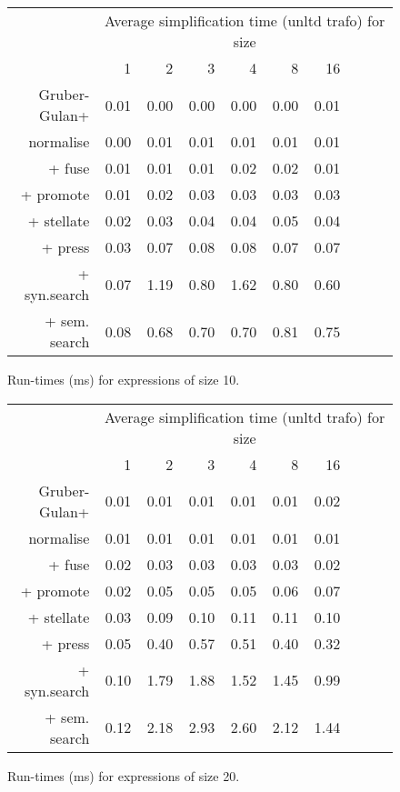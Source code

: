 \begin{figure}\begin{tabular}{rrrrrrrrrr}
 & \multicolumn{9}{c}{Average simplification time (unltd trafo) for size} \\
 & 1 & 2 & 3 & 4 & 8 & 16 \\
Gruber-Gulan+ & 0.01 & 0.00 & 0.00 & 0.00 & 0.00 & 0.01 \\
normalise & 0.00 & 0.01 & 0.01 & 0.01 & 0.01 & 0.01 \\
+ fuse & 0.01 & 0.01 & 0.01 & 0.02 & 0.02 & 0.01 \\
+ promote & 0.01 & 0.02 & 0.03 & 0.03 & 0.03 & 0.03 \\
+ stellate & 0.02 & 0.03 & 0.04 & 0.04 & 0.05 & 0.04 \\
+ press & 0.03 & 0.07 & 0.08 & 0.08 & 0.07 & 0.07 \\
+ syn.search & 0.07 & 1.19 & 0.80 & 1.62 & 0.80 & 0.60 \\
+ sem. search & 0.08 & 0.68 & 0.70 & 0.70 & 0.81 & 0.75 \\
\end{tabular}\caption{Run-times (ms) for expressions of size 10.}\end{figure}
\begin{figure}\begin{tabular}{rrrrrrrrrr}
 & \multicolumn{9}{c}{Average simplification time (unltd trafo) for size} \\
 & 1 & 2 & 3 & 4 & 8 & 16 \\
Gruber-Gulan+ & 0.01 & 0.01 & 0.01 & 0.01 & 0.01 & 0.02 \\
normalise & 0.01 & 0.01 & 0.01 & 0.01 & 0.01 & 0.01 \\
+ fuse & 0.02 & 0.03 & 0.03 & 0.03 & 0.03 & 0.02 \\
+ promote & 0.02 & 0.05 & 0.05 & 0.05 & 0.06 & 0.07 \\
+ stellate & 0.03 & 0.09 & 0.10 & 0.11 & 0.11 & 0.10 \\
+ press & 0.05 & 0.40 & 0.57 & 0.51 & 0.40 & 0.32 \\
+ syn.search & 0.10 & 1.79 & 1.88 & 1.52 & 1.45 & 0.99 \\
+ sem. search & 0.12 & 2.18 & 2.93 & 2.60 & 2.12 & 1.44 \\
\end{tabular}\caption{Run-times (ms) for expressions of size 20.}\end{figure}
